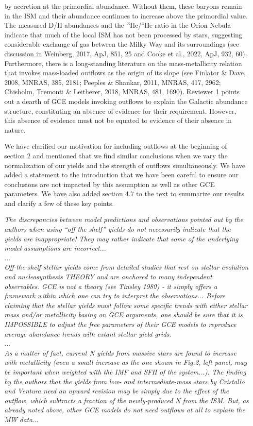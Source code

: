 \documentclass[12pt]{article}
\newcommand\doublebreak[0]{\par\null\par\noindent}
\begin{document}
by accretion at the primordial abundance.
Without them, these baryons remain in the ISM and their abundance continues to
increase above the primordial value.
The measured D/H abundances and the~$^3$He/$^4$He ratio in the Orion Nebula
indicate that much of the local ISM has not been processed by stars, suggesting
considerable exchange of gas between the Milky Way and its surroundings
(see discussion in Weinberg, 2017, ApJ, 851, 25 and Cooke et al., 2022, ApJ,
932, 60).
Furthermore, there is a long-standing literature on the mass-metallicity
relation that invokes mass-loaded outflows as the origin of its slope (see
Finlator \& Dave, 2008, MNRAS, 385, 2181; Peeples \& Shankar, 2011, MNRAS, 417,
2962; Chisholm, Tremonti \& Leitherer, 2018, MNRAS, 481, 1690).
Reviewer 1 points out a dearth of GCE models invoking outflows to explain the
Galactic abundance structure, constituting an absence of evidence for their
requirement.
However, this absence of evidence must not be equated to evidence of their
absence in nature.
\par
We have clarified our motivation for including outflows at the beginning of
section 2 and mentioned that we find similar conclusions when we vary the
normalization of our yields and the strength of outflows simultaneously.
We have added a statement to the introduction that we have been careful to
ensure our conclusions are not impacted by this assumption as well as other
GCE parameters.
We have also added section 4.7 to the text to summarize our results and
clarify a few of these key points.
\doublebreak
\textit{%
The discrepancies between model predictions and observations pointed out by the
authors when using ``off-the-shelf'' yields do not necessarily indicate that
the yields are inappropriate!
They may rather indicate that some of the underlying model assumptions are
incorrect...
\\
...
\\
Off-the-shelf stellar yields come from detailed studies that rest on stellar
evolution and nucleosynthesis THEORY and are anchored to many independent
observables.
GCE is not a theory (see Tinsley 1980) - it simply offers a framework within
which one can try to interpret the observations...
Before claiming that the stellar yields must follow some specific trends with
either stellar mass and/or metallicity basing on GCE arguments, one should be
sure that it is IMPOSSIBLE to adjust the free parameters of their GCE models to
reproduce average abundance trends with extant stellar yield grids.
\\
...
\\
As a matter of fact, current N yields from massive stars are found to increase
with metallicity (even a small increase as the one shown in Fig.2, left panel,
may be important when weighted with the IMF and SFH of the system...).
The finding by the authors that the yields from low- and intermediate-mass
stars by Cristallo and Ventura need an upward revision may be simply due to the
effect of the outflow, which subtracts a fraction of the newly-produced N from
the ISM. But, as already noted above, other GCE models do not need outflows at
all to explain the MW data...
}
\end{document}
